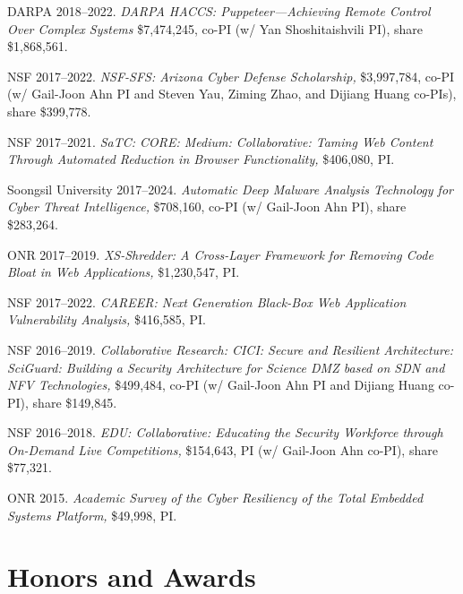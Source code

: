 \documentclass[11pt,letterpaper,sans]{moderncv}
\begin{document}
\begin{etaremune}

  \item DARPA 2018--2022. \textit{DARPA HACCS: Puppeteer---Achieving Remote Control Over Complex Systems} \$7,474,245, co-PI (w/ Yan Shoshitaishvili PI), share \$1,868,561.
  
  \item NSF 2017--2022. \textit{NSF-SFS: Arizona Cyber Defense
    Scholarship,} \$3,997,784, co-PI (w/ Gail-Joon Ahn PI and Steven
    Yau, Ziming Zhao, and Dijiang Huang co-PIs), share \$399,778.

  \item NSF 2017--2021. \textit{SaTC: CORE: Medium: Collaborative:
    Taming Web Content Through Automated Reduction in Browser
    Functionality,} \$406,080, PI.

  \item Soongsil University 2017--2024. \textit{Automatic Deep Malware
    Analysis Technology for Cyber Threat Intelligence,} \$708,160,
    co-PI (w/ Gail-Joon Ahn PI), share \$283,264.

  \item ONR 2017--2019. \textit{XS-Shredder: A Cross-Layer Framework
    for Removing Code Bloat in Web Applications,} \$1,230,547, PI.

  \item NSF 2017--2022. \textit{CAREER: Next Generation Black-Box Web
    Application Vulnerability Analysis,} \$416,585, PI.
  
  \item NSF 2016--2019. \textit{Collaborative Research: CICI: Secure
    and Resilient Architecture: SciGuard: Building a Security
    Architecture for Science DMZ based on SDN and NFV Technologies,}
    \$499,484, co-PI (w/ Gail-Joon Ahn PI and Dijiang Huang co-PI),
    share \$149,845.

  \item NSF 2016--2018. \textit{EDU: Collaborative: Educating the
    Security Workforce through On-Demand Live Competitions,}
    \$154,643, PI (w/ Gail-Joon Ahn co-PI), share \$77,321.

  \item ONR 2015. \textit{Academic Survey of the Cyber Resiliency of
    the Total Embedded Systems Platform,} \$49,998, PI. 
  
\end{etaremune}

\section{Honors and Awards}
\end{document}
